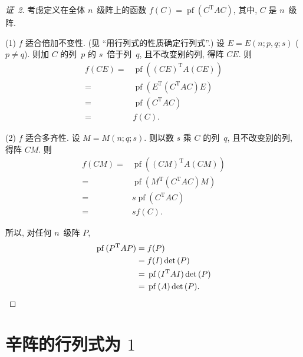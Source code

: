 \documentclass[../libro.tex]{subfiles}
\begin{document}
\begin{proof}[证~2]
    考虑定义在全体 \(n\)~级阵上的函数
    \(f(C) = \operatorname{pf} {(C^{\mathrm{T}} A C)}\),
    其中, \(C\) 是 \(n\)~级阵.

    (1)
    \(f\) 适合倍加不变性.
    (见 ``用行列式的性质确定行列式''.)
    设 \(E = E(n; p, q; s)\)
    (\(p \neq q\)).
    则加 \(C\) 的列~\(p\) 的 \(s\)~倍于列~\(q\),
    且不改变别的列,
    得阵 \(C E\).
    则
    \begin{align*}
        f(C E)
        = {} &
        \operatorname{pf} {((C E)^{\mathrm{T}} A (C E))}
        \\
        = {} &
        \operatorname{pf}
        {(E^{\mathrm{T}} (C^{\mathrm{T}} A C) E)}
        \\
        = {} &
        \operatorname{pf}
        {(C^{\mathrm{T}} A C)}
        \\
        = {} &
        f(C).
    \end{align*}

    (2)
    \(f\) 适合多齐性.
    设 \(M = M(n; q; s)\).
    则以数 \(s\) 乘 \(C\) 的列~\(q\),
    且不改变别的列,
    得阵 \(C M\).
    则
    \begin{align*}
        f(C M)
        = {} &
        \operatorname{pf} {((C M)^{\mathrm{T}} A (C M))}
        \\
        = {} &
        \operatorname{pf}
        {(M^{\mathrm{T}} (C^{\mathrm{T}} A C) M)}
        \\
        = {} &
        s \operatorname{pf}
        {(C^{\mathrm{T}} A C)}
        \\
        = {} &
        s f(C).
    \end{align*}

    所以, 对任何 \(n\)~级阵 \(P\),
    \begin{align*}
        \operatorname{pf} {(P^{\mathrm{T}} A P)}
        = {} &
        f(P)
        \\
        = {} &
        f(I) \det {(P)}
        \\
        = {} &
        \operatorname{pf} {(I^{\mathrm{T}} A I)} \det {(P)}
        \\
        = {} &
        \operatorname{pf} {(A)} \det {(P)}.
        \qedhere
    \end{align*}
\end{proof}

\section{\texorpdfstring{辛阵的行列式为 \(1\)}%
{辛阵的行列式为 1}}
\end{document}

